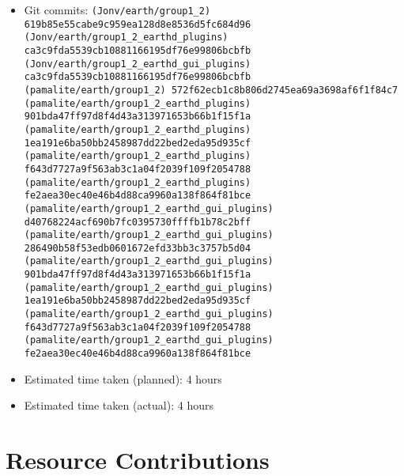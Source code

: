 \documentclass{article}
\begin{document}
\begin{itemize}
\begin{itemize}
            \item Git commits: \texttt{(Jonv/earth/group1\_2) 619b85e55cabe9c959ea128d8e8536d5fc684d96} \\
                \texttt{(Jonv/earth/group1\_2\_earthd\_plugins) ca3c9fda5539cb10881166195df76e99806bcbfb} \\
                \texttt{(Jonv/earth/group1\_2\_earthd\_gui\_plugins) ca3c9fda5539cb10881166195df76e99806bcbfb} \\
                \texttt{(pamalite/earth/group1\_2)  572f62ecb1c8b806d2745ea69a3698af6f1f84c7} \\
                \texttt{(pamalite/earth/group1\_2\_earthd\_plugins) 901bda47ff97d8f4d43a313971653b66b1f15f1a} \\
                \texttt{(pamalite/earth/group1\_2\_earthd\_plugins) 1ea191e6ba50bb2458987dd22bed2eda95d935cf} \\
                \texttt{(pamalite/earth/group1\_2\_earthd\_plugins) f643d7727a9f563ab3c1a04f2039f109f2054788} \\
                \texttt{(pamalite/earth/group1\_2\_earthd\_plugins) fe2aea30ec40e46b4d88ca9960a138f864f81bce} \\
                \texttt{(pamalite/earth/group1\_2\_earthd\_gui\_plugins) d40768224acf690b7fc0395730ffffb1b78c2bff} \\
                \texttt{(pamalite/earth/group1\_2\_earthd\_gui\_plugins) 286490b58f53edb0601672efd33bb3c3757b5d04} \\
                \texttt{(pamalite/earth/group1\_2\_earthd\_gui\_plugins) 901bda47ff97d8f4d43a313971653b66b1f15f1a} \\
                \texttt{(pamalite/earth/group1\_2\_earthd\_gui\_plugins) 1ea191e6ba50bb2458987dd22bed2eda95d935cf} \\
                \texttt{(pamalite/earth/group1\_2\_earthd\_gui\_plugins) f643d7727a9f563ab3c1a04f2039f109f2054788} \\
                \texttt{(pamalite/earth/group1\_2\_earthd\_gui\_plugins) fe2aea30ec40e46b4d88ca9960a138f864f81bce}
            \item Estimated time taken (planned): 4 hours
            \item Estimated time taken (actual): 4 hours
        \end{itemize}
\end{itemize}

\section*{Resource Contributions}
\end{document}
